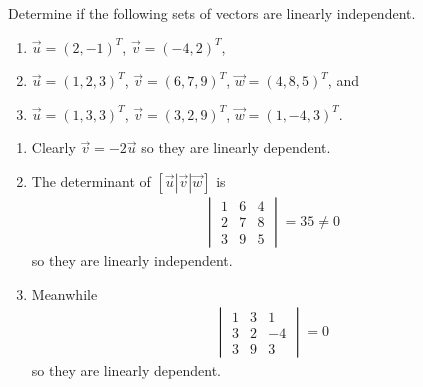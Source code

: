 \begin{Exercise}
Determine if the following sets of vectors are linearly independent.
\begin{enumerate}[label=(\alph*)]
\item $\vec{u} = (2,-1)^T$, $\vec{v} = (-4,2)^T$,
\item $\vec{u} = (1,2,3)^T$, $\vec{v} = (6,7,9)^T$, $\vec{w} = (4,8,5)^T$, and
\item $\vec{u} = (1,3,3)^T$, $\vec{v}=(3,2,9)^T$, $\vec{w} = (1,-4,3)^T$.
\end{enumerate}
\end{Exercise}
\begin{Answer}
\begin{enumerate}[label=(\alph*)]
\item Clearly $\vec{v} = -2\vec{u}$ so they are linearly dependent.
\item The determinant of $[\vec{u}|\vec{v}|\vec{w}]$ is
\begin{align*}
\begin{vmatrix}
1 & 6 & 4 \\
2 & 7 & 8 \\
3 & 9 & 5
\end{vmatrix} = 35 \neq 0
\end{align*}
so they are linearly independent.
\item Meanwhile
\begin{align*}
\begin{vmatrix}
1 & 3 & 1 \\
3 & 2 & -4 \\
3 & 9 & 3
\end{vmatrix} = 0
\end{align*}
so they are linearly dependent.
\end{enumerate}
\end{Answer}

